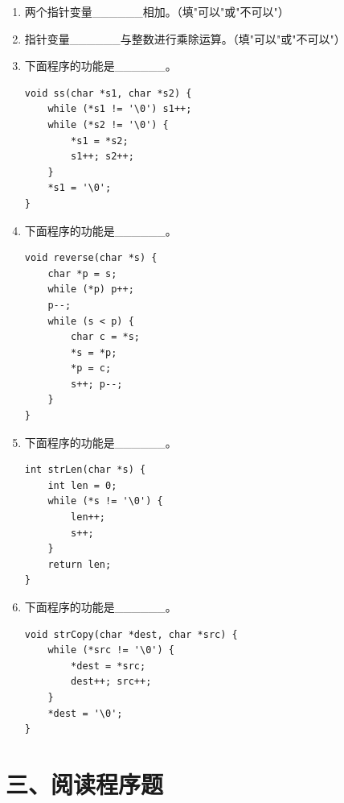 \documentclass[a4paper,12pt]{article}
\begin{document}
\begin{enumerate}
	\item 两个指针变量\_\_\_\_\_\_相加。（填"可以"或"不可以"）
	      \vspace{0.3cm}

	\item 指针变量\_\_\_\_\_\_与整数进行乘除运算。（填"可以"或"不可以"）
	      \vspace{0.3cm}

	\item 下面程序的功能是\_\_\_\_\_\_。
	      \begin{verbatim}
void ss(char *s1, char *s2) {
    while (*s1 != '\0') s1++;
    while (*s2 != '\0') {
        *s1 = *s2;
        s1++; s2++;
    }
    *s1 = '\0';
}
    \end{verbatim}
	      \vspace{0.3cm}

	\item 下面程序的功能是\_\_\_\_\_\_。
	      \begin{verbatim}
void reverse(char *s) {
    char *p = s;
    while (*p) p++;
    p--;
    while (s < p) {
        char c = *s;
        *s = *p;
        *p = c;
        s++; p--;
    }
}
    \end{verbatim}
	      \vspace{0.3cm}

	\item 下面程序的功能是\_\_\_\_\_\_。
	      \begin{verbatim}
int strLen(char *s) {
    int len = 0;
    while (*s != '\0') {
        len++;
        s++;
    }
    return len;
}
    \end{verbatim}
	      \vspace{0.3cm}

	\item 下面程序的功能是\_\_\_\_\_\_。
	      \begin{verbatim}
void strCopy(char *dest, char *src) {
    while (*src != '\0') {
        *dest = *src;
        dest++; src++;
    }
    *dest = '\0';
}
    \end{verbatim}
	      \vspace{0.3cm}
\end{enumerate}

\section*{三、阅读程序题}
\end{document}
